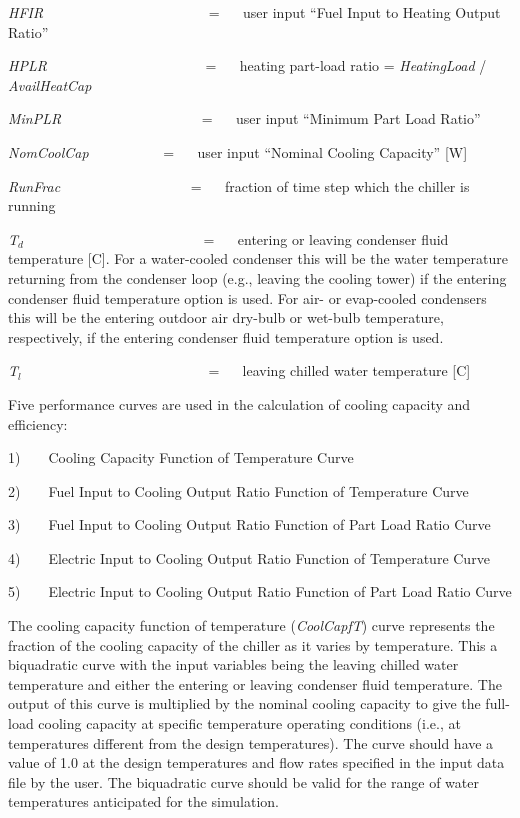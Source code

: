 \emph{HFIR}~~~~~~~~~~~~~~~~~~~~~~~ = ~~ user input ``Fuel Input to Heating Output Ratio''

\emph{HPLR}~~~~~~~~~~~~~~~~~~~~~~ = ~~ heating part-load ratio = \emph{HeatingLoad} / \emph{AvailHeatCap}

\emph{MinPLR~~~~~~~~~~~~~~~~~~~} = ~~ user input ``Minimum Part Load Ratio''

\emph{NomCoolCap}~~~~~~~~~~ = ~~ user input ``Nominal Cooling Capacity'' {[}W{]}

\emph{RunFrac}~~~~~~~~~~~~~~~~~~ = ~~ fraction of time step which the chiller is running

\emph{T\(_{d}\)}~~~~~~~~~~~~~~~~~~~~~~~~~ = ~~ entering or leaving condenser fluid temperature {[}C{]}. For a water-cooled condenser this will be the water temperature returning from the condenser loop (e.g., leaving the cooling tower) if the entering condenser fluid temperature option is used. For air- or evap-cooled condensers this will be the entering outdoor air dry-bulb or wet-bulb temperature, respectively, if the entering condenser fluid temperature option is used.

\emph{T\(_{l}\)}~~~~~~~~~~~~~~~~~~~~~~~~~~ = ~~ leaving chilled water temperature {[}C{]}

Five performance curves are used in the calculation of cooling capacity and efficiency:

1)~~~~Cooling Capacity Function of Temperature Curve

2)~~~~Fuel Input to Cooling Output Ratio Function of Temperature Curve

3)~~~~Fuel Input to Cooling Output Ratio Function of Part Load Ratio Curve

4)~~~~Electric Input to Cooling Output Ratio Function of Temperature Curve

5)~~~~Electric Input to Cooling Output Ratio Function of Part Load Ratio Curve

The cooling capacity function of temperature (\emph{CoolCapfT}) curve represents the fraction of the cooling capacity of the chiller as it varies by temperature. This a biquadratic curve with the input variables being the leaving chilled water temperature and either the entering or leaving condenser fluid temperature. The output of this curve is multiplied by the nominal cooling capacity to give the full-load cooling capacity at specific temperature operating conditions (i.e., at temperatures different from the design temperatures). The curve should have a value of 1.0 at the design temperatures and flow rates specified in the input data file by the user. The biquadratic curve should be valid for the range of water temperatures anticipated for the simulation.

